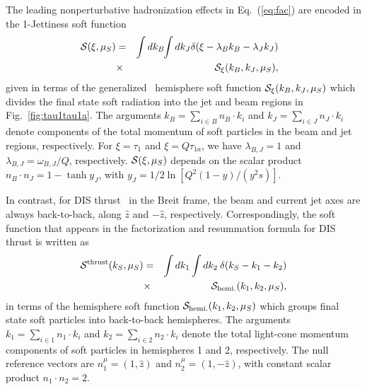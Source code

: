 \documentclass[prd,aps,nofootinbib,twocolumn,showpacs,amsmath,superscriptaddress]{revtex4-2}
\newcommand{\nn}{\nonumber}
\newcommand{\bea}{\begin{eqnarray}}
\newcommand{\eea}{\end{eqnarray}}
\begin{document}
The leading nonperturbative hadronization effects in Eq.~(\ref{eq:fac}) are encoded in the 1-Jettiness soft function
\bea
\label{eq:Sxi}
\hspace{-3mm}{\cal S}(\xi,\mu_S)&=& \int dk_B \hspace{-1mm} \int dk_J \delta(\xi-\lambda_B k_B-\lambda_J k_J) \nn 
\\
&\times& {\cal S}_{\xi} (k_B,k_J,\mu_S), 
\eea
given in terms of the generalized~\cite{Jouttenus:2011wh} hemisphere soft function ${\cal S}_{\xi} (k_B,k_J,\mu_S)$ which divides the final state soft radiation into the jet and beam regions  in Fig.~\ref{fig:tau1tau1a}. The arguments $k_B=\sum_{i\in B} n_B\cdot k_i$ and $k_J=\sum_{i\in J}n_J\cdot k_i$ denote components of the total momentum of soft particles in the beam and jet regions, respectively. For $\xi=\tau_1$ and $\xi=Q\tau_{1a}$, we have $\lambda_{B,J}=1$ and $\lambda_{B,J}=\omega_{B,J}/Q$, respectively.
${\cal S}(\xi,\mu_S)$  depends on the scalar product $n_B \cdot n_J= 1- \tanh y_J$, with $y_J=1/2 \ln \left [Q^2(1-y)/(y^2s)\right ]$.

 

In contrast, for   DIS thrust~\cite{Antonelli:1999kx,Dasgupta:2001sh,Dasgupta:2001eq,Dasgupta:2002bw,Dasgupta:2002dc,Kang:2013nha,Ee:2025scz}   in the Breit frame, the beam and current jet axes are always back-to-back, along $\hat{z}$ and $-\hat{z}$, respectively. Correspondingly, the soft function that appears in the factorization and resummation formula for DIS thrust is written as~\cite{Kang:2013nha} 
\bea
\label{eq:Sthrust}
{\cal S}^{\rm thrust}(k_S,\mu_S)&=&\int dk_1 \int dk_2 \>\delta (k_S-k_1-k_2)\nn \\
&\times& {\cal S}_{\rm hemi.}(k_1,k_2,\mu_S), 
\eea
in terms of the hemisphere soft function ${\cal S}_{\rm hemi.}(k_1,k_2,\mu_S)$ which groups final state soft particles into back-to-back hemispheres. The arguments  $k_1=\sum_{i\in 1} n_1\cdot k_i$ and $k_2=\sum_{i\in 2}n_2\cdot k_i$ denote the total light-cone momentum components of  soft particles in hemispheres 1 and 2, respectively.  The null reference vectors are $n_1^\mu=(1,\hat{z})$ and $n_2^\mu=(1,-\hat{z})$, with constant scalar product  $n_1\cdot n_2=2$.
 
\end{document}
